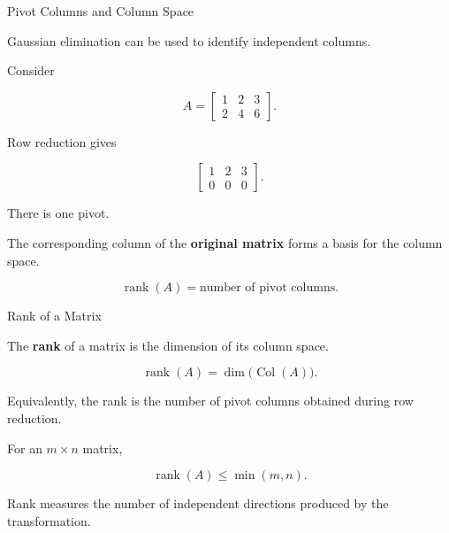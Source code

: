 
\begin{frame}{Pivot Columns and Column Space}

Gaussian elimination can be used to identify independent
columns.

Consider

\[
A=
\begin{bmatrix}
1&2&3\\
2&4&6
\end{bmatrix}.
\]

Row reduction gives

\[
\begin{bmatrix}
1&2&3\\
0&0&0
\end{bmatrix}.
\]

There is one pivot.

\vspace{0.3cm}

The corresponding column of the \textbf{original matrix}
forms a basis for the column space.

\[
\boxed{
\operatorname{rank}(A)
=
\text{number of pivot columns}.
}
\]

\end{frame}



\begin{frame}{Rank of a Matrix}

The \textbf{rank} of a matrix is the dimension of its
column space.

\[
\boxed{
\operatorname{rank}(A)
=
\dim\bigl(\operatorname{Col}(A)\bigr).
}
\]

Equivalently, the rank is the number of pivot columns
obtained during row reduction.

\vspace{0.4cm}

For an $m\times n$ matrix,

\[
\boxed{
\operatorname{rank}(A)\leq\min(m,n).
}
\]

Rank measures the number of independent directions produced
by the transformation.

\end{frame}



